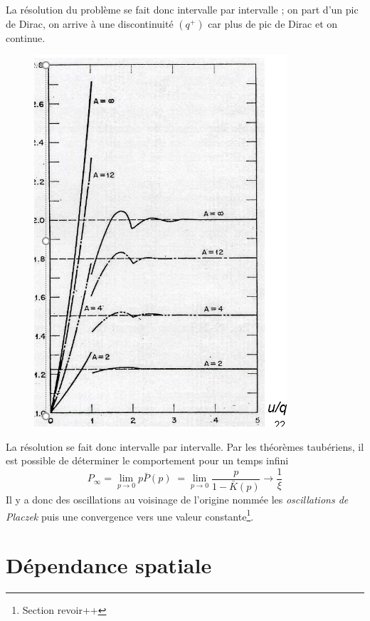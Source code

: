 	La résolution du problème se fait donc intervalle par intervalle ; on part d'un pic de Dirac, 
	on arrive à une discontinuité $(q^+)$ car plus de pic de Dirac et on continue.\\
	
	\begin{figure}
	\vspace{-5mm}
	\includegraphics[scale=0.4]{ch7/image5.png}
	\end{figure}
	La résolution se fait donc intervalle par intervalle. Par les théorèmes taubériens, il est 
	possible de déterminer le comportement pour un temps infini
	\begin{equation}
	{P_\infty } = \mathop {\lim }\limits_{p \to 0} p\bar P(p)\; = \mathop {\lim }\limits_{p \to 0}
	 \frac{p}{{1 - \bar K(p)}} \to \frac{1}{\xi }
	\end{equation}
	Il y a donc des oscillations au voisinage de l'origine nommée les \textit{oscillations de Placzek}
	puis une convergence vers une valeur constante\footnote{Section  revoir++}.




\section{Dépendance spatiale}
